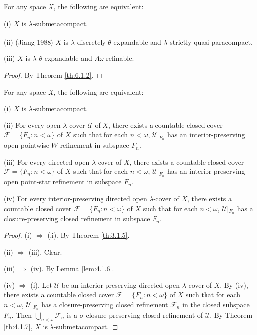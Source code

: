 \documentclass[main.tex]{subfiles}
\begin{document}
{\theorem{} \label{th:6.1.5} 
For any space $X$, the following are equivalent:

\textup{(i)}  $X$ is $\lambda$-submetacompact.


\textup{(ii)}  \textup{(\hstretch{1.8}{[}Jiang 1988\hstretch{1.8}{]}\textsuperscript{\cite{Jiang1988}})} 
$X$ is $\lambda$-discretely $\theta$-expandable and $\lambda$-strictly quasi-paracompact.

\textup{(iii)} $X$ is $\lambda$-$\theta$-expandable and $A\omega$-refinable.
}

\begin{proof} 
By Theorem \ref{th:6.1.2}.
\end{proof}

{\theorem{} \label{th:6.1.6} 
For any space $X$, the following are equivalent:

\textup{(i)} $X$ is $\lambda$-submetacompact.

\textup{(ii)} For every open $\lambda$-cover $\mathscr{U}$ of $X$, there exists
 a countable closed cover $\mathscr{F} = \{F_n: n < \omega\}$ of $X$ such that for 
 each $n < \omega$, $\mathscr{U}\vert{}_{F_n}$ has an interior-preserving 
 open pointwise $W$-refinement in subspace $F_n$.

\textup{(iii)} For every directed open $\lambda$-cover of $X$, there exists a countable closed cover $\mathscr{F} = \{F_n: n < \omega\}$ of $X$ such that for each 
$n < \omega$, $\mathscr{U}\vert{}_{F_n}$ has an interior-preserving open point-star 
refinement in subspace $F_n$.

\textup{(iv)} For every interior-preserving directed open $\lambda$-cover of $X$, there exists a 
countable closed cover $\mathscr{F} = \{F_n: n < \omega\}$ of $X$ such that for each 
$n < \omega$, $\mathscr{U}\vert{}_{F_n}$ has a closure-preserving closed refinement 
in subspace $F_n$.
}

\begin{proof} 
(i) $\Rightarrow$ (ii). By Theorem \ref{th:3.1.5}.

(ii) $\Rightarrow$ (iii). Clear.

(iii) $\Rightarrow$ (iv). By Lemma \ref{lem:4.1.6}.

(iv) $\Rightarrow$ (i). Let $\mathscr{U}$ be an interior-preserving directed open 
$\lambda$-cover of $X$. By (iv), there exists a countable closed cover 
$\mathscr{F}= \{F_n: n < \omega\}$ of $X$ such that for each $n < \omega$, 
$\mathscr{U}\vert{}_{F_n}$ has a closure-preserving closed refinement $\mathscr{F}_n$ 
in the closed subspace $F_n$. Then $\bigcup_{n < \omega}\mathscr{F}_n$ is a 
$\sigma$-closure-preserving closed refinement of $\mathscr{U}$. 
By Theorem \ref{th:4.1.7}, $X$ is $\lambda$-submetacompact.
\end{proof}



\end{document}
